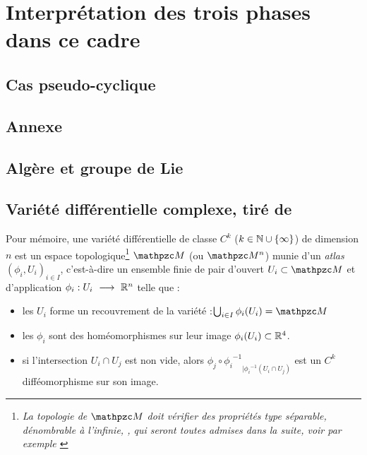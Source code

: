 \section{Interprétation des trois phases dans ce cadre}

\subsection{Cas pseudo-cyclique}








\begin{annexe}

\section{Annexe}

\subsection{Algère et groupe de Lie} \label{ann:2Lie}




\subsection{Variété différentielle complexe, tiré de \cite{nakahara_geometry_2003}}

Pour mémoire, une variété différentielle de classe $C^k$ ($k\in\mathbb{N}\cup\{\infty\}$) de dimension $n$ est un espace topologique\footnote{\itshape
	La topologie de $\manu$ doit vérifier des propriétés type séparable, dénombrable à l'infinie, \etc, qui seront toutes admises dans la suite, voir par exemple \cite[chap. 2]{lafontaine_introduction_2015}}
$\manu$ (ou $\manu^n$) munie d'un \emph{atlas} $(\phi_i, U_i)_{i\in I}$, c'est-à-dire un ensemble finie de pair d'ouvert $U_i\subset \manu$ et d'application $\phi_i :U_i\ \longrightarrow\ \mathbb{R}^n$ telle que :
\begin{itemize}
	
	\item les $U_i$ forme un recouvrement de la variété :\qquad $\bigcup_{i\in I} \phi_i(U_i) = \manu$
	
	\item les $\phi_i$ sont des homéomorphismes sur leur image $\phi_i(U_i)\subset\mathbb{R}^4$.
	
	\item si l'intersection $U_i \cap U_j$ est non vide, alors ${\phi_j \circ {\phi_i}^{-1}}_{| {\phi_i}^{-1}(U_i\cap U_j)}$ est un $C^k$ difféomorphisme sur son image.
\end{itemize}


\end{annexe}
